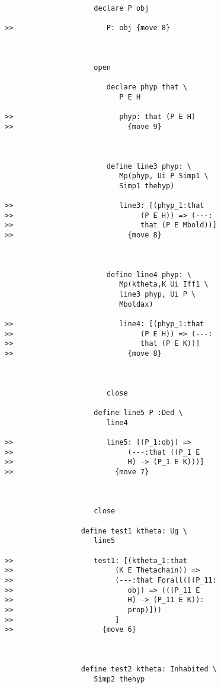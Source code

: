 \documentclass[12pt]{article}
\begin{document}
\begin{verbatim}
                     declare P obj

>>                      P: obj {move 8}



                     open

                        declare phyp that \
                           P E H

>>                         phyp: that (P E H)
>>                           {move 9}



                        define line3 phyp: \
                           Mp(phyp, Ui P Simp1 \
                           Simp1 thehyp)

>>                         line3: [(phyp_1:that
>>                              (P E H)) => (---:
>>                              that (P E Mbold))]
>>                           {move 8}



                        define line4 phyp: \
                           Mp(ktheta,K Ui Iff1 \
                           line3 phyp, Ui P \
                           Mboldax)

>>                         line4: [(phyp_1:that
>>                              (P E H)) => (---:
>>                              that (P E K))]
>>                           {move 8}



                        close

                     define line5 P :Ded \
                        line4

>>                      line5: [(P_1:obj) =>
>>                           (---:that ((P_1 E
>>                           H) -> (P_1 E K)))]
>>                        {move 7}



                     close

                  define test1 ktheta: Ug \
                     line5

>>                   test1: [(ktheta_1:that
>>                        (K E Thetachain)) =>
>>                        (---:that Forall([(P_11:
>>                           obj) => (((P_11 E
>>                           H) -> (P_11 E K)):
>>                           prop)]))
>>                        ]
>>                     {move 6}



                  define test2 ktheta: Inhabited \
                     Simp2 thehyp


\end{verbatim}
\end{document}
